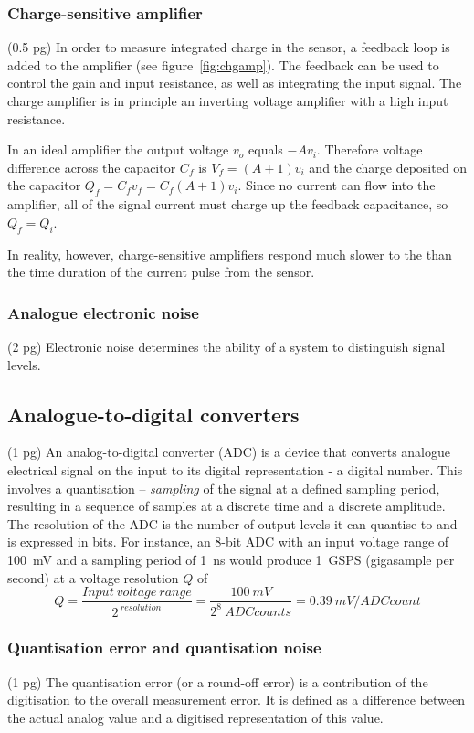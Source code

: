 \documentclass[12pt]{mytustyle}  %
\begin{document}
\subsubsection{Charge-sensitive amplifier}
(0.5 pg)
In order to measure integrated charge in the sensor, a feedback loop is added to the amplifier (see figure~\ref{fig:chgamp}). The feedback can be used to control the gain and input resistance, as well as integrating the input signal. The charge amplifier is in principle an inverting voltage amplifier with a high input resistance. 
 
In an ideal amplifier the output voltage $v_o$ equals $-Av_i$. Therefore voltage difference across the capacitor $C_f$ is $V_f=(A+1)v_i$ and the charge deposited on the capacitor $Q_f=C_f v_f = C_f (A+1)v_i$. Since no current can flow into the amplifier, all of the signal current must charge up the feedback capacitance, so $Q_f = Q_i$.

In reality, however, charge-sensitive amplifiers respond much slower to the than the time duration of the current pulse from the sensor. 


\subsubsection{Analogue electronic noise}
(2 pg)
Electronic noise determines the ability of a system to distinguish signal levels.

\subsection{Analogue-to-digital converters}
(1 pg)
An analog-to-digital converter (ADC) is a device that converts analogue electrical signal on the input to its digital representation - a digital number. This involves a quantisation -- \emph{sampling} of the signal at a defined sampling period, resulting in a sequence of samples at a discrete time and a discrete amplitude. The resolution of the ADC is the number of output levels it can quantise to and is expressed in bits. For instance, an 8-bit ADC with an input voltage range of 100~mV and a sampling period of 1~ns would produce 1~GSPS (gigasample per second) at a voltage resolution $Q$ of 
\begin{equation}
\label{eq:mvpercnt}
Q=\frac{Input~voltage~range}{2^{~resolution}}  = \frac{100~mV}{2^8~ADC counts} = 0.39~mV/ADC count
\end{equation} 


\subsubsection{Quantisation error and quantisation noise}
(1 pg)
The quantisation error (or a round-off error) is a contribution of the digitisation to the overall measurement error. It is defined as a difference between the actual analog value and a digitised representation of this value.
\end{document}
